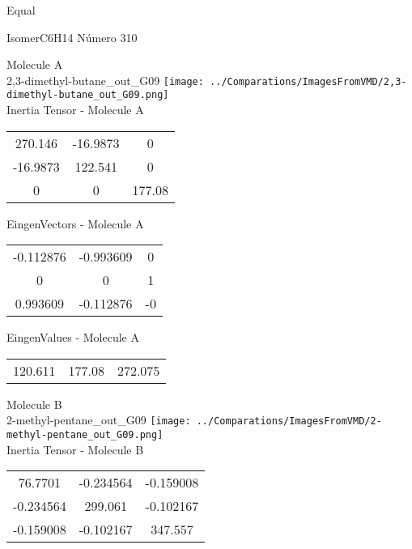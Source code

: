 \begin{center}
\vtab
\vtab
\textcolor{NavyBlue}{\Large Equal}
\end{center}

 \newpage

\vtab[-2cm]
\begin{center}
{\large IsomerC6H14 \tab Número 310}
\end{center}
\begin{multicols}{2}
\begin{center}

Molecule A \\ 
2,3-dimethyl-butane\_out\_G09
\texttt{[image: ../Comparations/ImagesFromVMD/2,3-dimethyl-butane\_out\_G09.png]}
\\
Inertia Tensor - Molecule A \\
\vtab

\begin{tabular}{|c c c|}
270.146	 & 	-16.9873	 & 	0	 \\
-16.9873	 & 	122.541	 & 	0	 \\
0	 & 	0	 & 	177.08
\end{tabular}

\vtab
 EingenVectors - Molecule A     \\
\vtab
\begin{tabular}{|c c c|}
-0.112876	 & 	-0.993609	 & 	0	 \\
0	 & 	0	 & 	1	 \\
0.993609	 & 	-0.112876	 & 	-0
\end{tabular}

\vtab
 EingenValues - Molecule A     \\
\vtab
\begin{tabular}{|c c c|}
120.611	 & 	177.08	 & 	272.075	 \\
\end{tabular}
\columnbreak

Molecule B \\ 
2-methyl-pentane\_out\_G09
\texttt{[image: ../Comparations/ImagesFromVMD/2-methyl-pentane\_out\_G09.png]}
\\
Inertia Tensor - Molecule B \\
\vtab

\begin{tabular}{|c c c|}
76.7701	 & 	-0.234564	 & 	-0.159008	 \\
-0.234564	 & 	299.061	 & 	-0.102167	 \\
-0.159008	 & 	-0.102167	 & 	347.557
\end{tabular}


\end{center}
\end{multicols}
